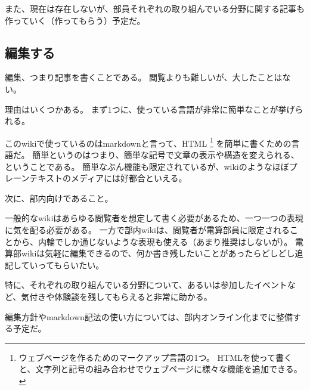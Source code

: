 \documentclass[lualatex,ja=standard,12pt,a4j]{bxjsbook}
\begin{document}
                また、現在は存在しないが、部員それぞれの取り組んでいる分野に関する記事も作っていく（作ってもらう）予定だ。
                
            \subsection{編集する}
            	編集、つまり記事を書くことである。
                閲覧よりも難しいが、大したことはない。
                
                理由はいくつかある。
                まず1つに、使っている言語が非常に簡単なことが挙げられる。
                
                このwikiで使っているのはmarkdownと言って、HTML
                \footnote{ウェブページを作るためのマークアップ言語の1つ。
                HTMLを使って書くと、文字列と記号の組み合わせでウェブページに様々な機能を追加できる。}
                を簡単に書くための言語だ。
                簡単というのはつまり、簡単な記号で文章の表示や構造を変えられる、ということである。
                簡単なぶん機能も限定されているが、wikiのようなほぼプレーンテキストのメディアには好都合といえる。
                
                次に、部内向けであること。
                
                一般的なwikiはあらゆる閲覧者を想定して書く必要があるため、一つ一つの表現に気を配る必要がある。
                一方で部内wikiは、閲覧者が電算部員に限定されることから、内輪でしか通じないような表現も使える（あまり推奨はしないが）。
                電算部wikiは気軽に編集できるので、何か書き残したいことがあったらどしどし追記していってもらいたい。
                
                特に、それぞれの取り組んでいる分野について、あるいは参加したイベントなど、気付きや体験談を残してもらえると非常に助かる。
                
                編集方針やmarkdown記法の使い方については、部内オンライン化までに整備する予定だ。
                
\end{document}
